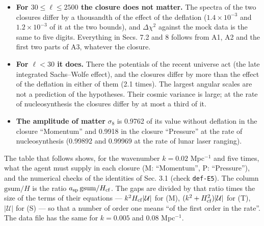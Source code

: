 \documentclass[
  10pt,
]{article}
\providecommand{\tightlist}{%
  \setlength{\itemsep}{0pt}\setlength{\parskip}{0pt}}
\begin{document}
\begin{itemize}
\tightlist
\item
  \textbf{For \(30\le\ell\le2500\) the closure does not matter.} The
  spectra of the two closures differ by a thousandth of the effect of
  the deflation (\(1.4\times10^{-3}\) and \(1.2\times10^{-3}\) of it at
  the two bounds), and \(\Delta\chi^2\) against the mock data is the
  same to five digits. Everything in Secs. 7.2 and 8 follows from A1, A2
  and the first two parts of A3, whatever the closure.
\item
  \textbf{For \(\ell<30\) it does.} There the potentials of the recent
  universe act (the late integrated Sachs--Wolfe effect), and the
  closures differ by more than the effect of the deflation in either of
  them (2.1 times). The largest angular scales are not a prediction of
  the hypotheses. Their cosmic variance is large; at the rate of
  nucleosynthesis the closures differ by at most a third of it.
\item
  \textbf{The amplitude of matter} \(\sigma_8\) is 0.9762 of its value
  without deflation in the closure ``Momentum'' and 0.9918 in the
  closure ``Pressure'' at the rate of nucleosynthesis (0.99892 and
  0.99969 at the rate of lunar laser ranging).
\end{itemize}

The table that follows shows, for the wavenumber \(k=0.02\) Mpc\(^{-1}\)
and five times, what the agent must supply in each closure (M:
``Momentum'', P: ``Pressure''), and the numerical checks of the
identities of Sec. 3.1 (check \texttt{def-E5}). The column
\(\mathrm{gsum}/H\) is the ratio
\(a_{\rm sp}\,\mathrm{gsum}/H_{\rm cf}\). The gaps are divided by that
ratio times the size of the terms of their equations ---
\(k^2H_{\rm cf}\lvert\mathcal U\rvert\) for (M),
\((k^2+H_{\rm cf}^2)\lvert\mathcal U\rvert\) for (T),
\(\lvert\mathcal U\rvert\) for (S) --- so that a number of order one
means ``of the first order in the rate''. The data file has the same for
\(k=0.005\) and \(0.08\) Mpc\(^{-1}\).
\end{document}
